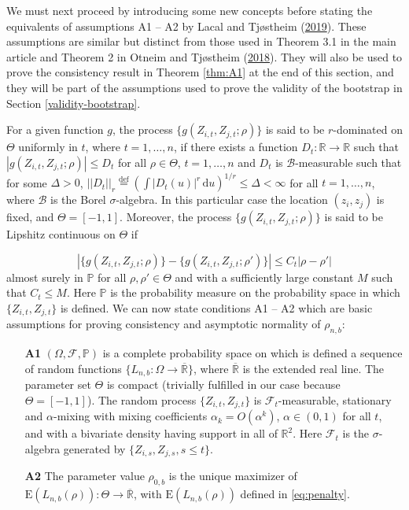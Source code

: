 \documentclass[
  12pt,
  letterpaper]{article}
\numberwithin{equation}{section}
\newcommand{\E}{\textrm{E}}
\newcommand{\di}{\,\textrm{d}}
\begin{document}
We must next proceed by introducing some new concepts before stating the equivalents of assumptions A1 -- A2 by Lacal and Tjøstheim (\protect\hyperlink{ref-lacal2018estimating}{2019}). These assumptions are similar but distinct from those used in Theorem 3.1 in the main article and Theorem 2 in Otneim and Tjøstheim (\protect\hyperlink{ref-otneim2017conditional}{2018}). They will also be used to prove the consistency result in Theorem \ref{thm:A1} at the end of this section, and they will be part of the assumptions used to prove the validity of the bootstrap in Section \ref{validity-bootstrap}.

For a given function \(g\), the process \(\{g(Z_{i,t}, Z_{j,t}; \rho)\}\) is said to be \(r\)-dominated on \(\Theta\) uniformly in \(t\), where \(t = 1,\ldots,n\), if there exists a function \(D_t: \mathbb{R} \rightarrow \mathbb{R}\) such that \(|g(Z_{i,t}, Z_{j,t}; \rho)| \leq D_t\) for all \(\rho \in \Theta\), \(t = 1,\ldots, n\) and \(D_t\) is \(\mathcal{B}\)-measurable such that for some \(\Delta > 0\), \(||D_t||_r \stackrel{\textrm{def}}{=} \left(\int |D_t(u)|^r\di u\right)^{1/r} \leq \Delta < \infty\) for all \(t = 1,\ldots,n\), where \(\mathcal{B}\) is the Borel \(\sigma\)-algebra. In this particular case the location \((z_i, z_j)\) is fixed, and \(\Theta = [-1,1]\). Moreover, the process \(\{g(Z_{i,t}, Z_{j,t}; \rho)\}\) is said to be Lipshitz continuous on \(\Theta\) if

\[|\{g(Z_{i,t}, Z_{j,t}; \rho)\} - \{g(Z_{i,t}, Z_{j,t}; \rho')\}| \leq C_t|\rho - \rho'|\]
almost surely in \(\mathbb{P}\) for all \(\rho,\rho'\in\Theta\) and with a sufficiently large constant \(M\) such that \(C_t\leq M\). Here \(\mathbb{P}\) is the probability measure on the probability space in which \(\{Z_{i,t}, Z_{j,t}\}\) is defined. We can now state conditions A1 -- A2 which are basic assumptions for proving consistency and asymptotic normality of \(\rho_{n,b}\):

\begin{itemize}
\item[\textbf{A1}] $(\Omega, \mathcal{F}, \mathbb{P})$ is a complete probability space on which is defined a sequence of random functions $\{L_{n,b}: \Omega\rightarrow\overline{\mathbb{R}}\}$, where $\overline{\mathbb{R}}$ is the extended real line. The parameter set $\Theta$ is compact (trivially fulfilled in our case because $\Theta = [-1,1]$). The random process $\{Z_{i,t}, Z_{j,t}\}$ is $\mathcal{F}_t$-measurable, stationary and $\alpha$-mixing with mixing coefficients $\alpha_k = O(\alpha^k)$, $\alpha \in (0,1)$ for all $t$, and with a bivariate density having support in all of $\mathbb{R}^2$. Here $\mathcal{F}_t$ is the $\sigma$-algebra generated by $\{Z_{i,s}, Z_{j,s}, s \leq t\}$.
\item[\textbf{A2}] The parameter value $\rho_{0,b}$ is the unique maximizer of $\E(L_{n,b}(\rho)): \Theta \rightarrow \overline{\mathbb{R}}$, with $\E(L_{n,b}(\rho))$ defined in \eqref{eq:penalty}.
\end{itemize}
\end{document}
